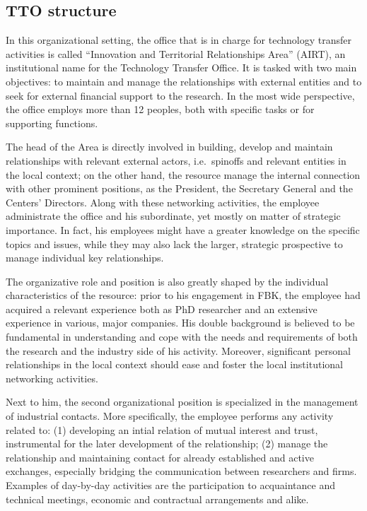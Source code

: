 \subsection{TTO structure}

In this organizational setting, the office that is in charge for technology transfer activities is called \enquote{Innovation and Territorial Relationships Area} (AIRT), an institutional name for the Technology Transfer Office. It is tasked with two main objectives: to maintain and manage the relationships with external entities and to seek for external financial support to the research. In the most wide perspective, the office employs more than 12 peoples, both with specific tasks or for supporting functions. 

The head of the Area is directly involved in building, develop and maintain relationships with relevant external actors, i.e.\ spinoffs and relevant entities in the local context; on the other hand, the resource manage the internal connection with other prominent positions, as the President, the Secretary General and the Centers' Directors. Along with these networking activities, the employee administrate the office and his subordinate, yet mostly on matter of strategic importance. In fact, his employees might have a greater knowledge on the specific topics and issues, while they may also lack the larger, strategic prospective to manage individual key relationships.

The organizative role and position is also greatly shaped by the individual characteristics of the resource: prior to his engagement in FBK, the employee had acquired a relevant experience both as PhD researcher and an extensive experience in various, major companies. His double background is believed to be fundamental in understanding and cope with the needs and requirements of both the research and the industry side of his activity. Moreover, significant personal relationships in the local context should ease and foster the local institutional networking activities.

Next to him, the second organizational position is specialized in the management of industrial contacts. More specifically, the employee performs any activity related to: (1) developing an intial relation of mutual interest and trust, instrumental for the later development of the relationship; (2) manage the relationship and maintaining contact for already established and active exchanges, especially bridging the communication between researchers and firms. Examples of day-by-day activities are the participation to acquaintance and technical meetings, economic and contractual arrangements and alike.

